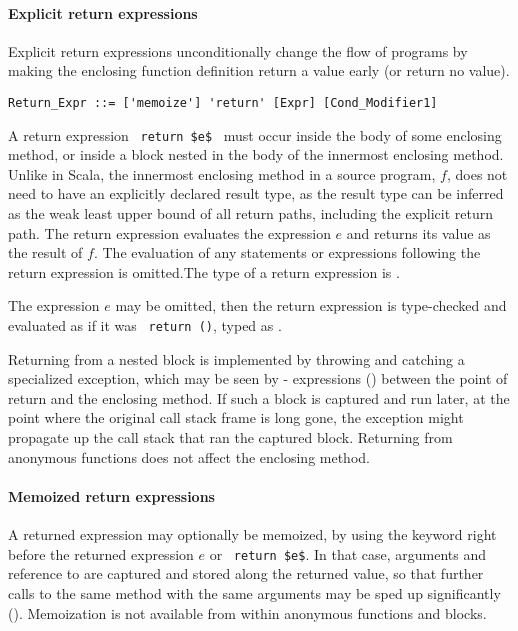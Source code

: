 \paragraph{Explicit return expressions}
Explicit return expressions unconditionally change the flow of programs by making the enclosing function definition return a value early (or return no value). 

\syntax\begin{lstlisting}
Return_Expr ::= ['memoize'] 'return' [Expr] [Cond_Modifier1]
\end{lstlisting}

A return expression ~\lstinline!return $e$!~ must occur inside the body of some enclosing method, or inside a block nested in the body of the innermost enclosing method. Unlike in Scala, the innermost enclosing method in a source program, $f$, does not need to have an explicitly declared result type, as the result type can be inferred as the weak least upper bound of all return paths, including the explicit return path. The return expression evaluates the expression $e$ and returns its value as the result of $f$. The evaluation of any statements or expressions following the return expression is omitted.The type of a return expression is .

The expression $e$ may be omitted, then the return expression  is type-checked and evaluated as if it was ~\lstinline!return ()!, typed as . 

Returning from a nested block is implemented by throwing and catching a specialized exception, which may be seen by - expressions () between the point of return and the enclosing method. If such a block is captured and run later, at the point where the original call stack frame is long gone, the exception might propagate up the call stack that ran the captured block. Returning from anonymous functions does not affect the enclosing method. 

\paragraph{Memoized return expressions}
A returned expression may optionally be memoized, by using the keyword  right before the returned expression $e$ or ~\lstinline!return $e$!. In that case, arguments and reference to  are captured and stored along the returned value, so that further calls to the same method with the same arguments may be sped up significantly (). Memoization is not available from within anonymous functions and blocks. 






